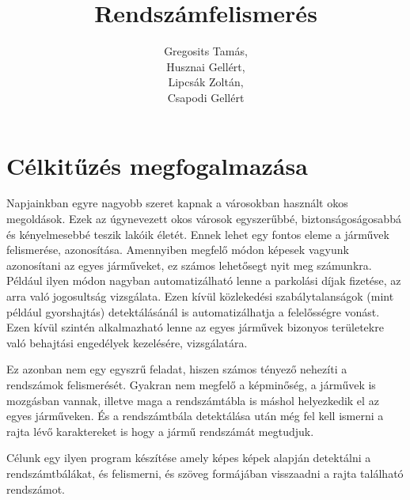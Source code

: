 \documentclass[12pt,a4paper]{article}
\author{Gregosits Tamás,\\Husznai Gellért,\\Lipcsák Zoltán,\\Csapodi Gellért}
\title{Rendszámfelismerés}
\begin{document}
\maketitle
\newpage
\tableofcontents
\newpage
    \section{Célkitűzés megfogalmazása}
    Napjainkban egyre nagyobb szeret kapnak a városokban használt okos megoldások.
    Ezek az úgynevezett okos városok egyszerűbbé, biztonságoságosabbá és kényelmesebbé teszik lakóik életét.
    Ennek lehet egy fontos eleme a járművek felismerése, azonosítása. 
    Amennyiben megfelő módon képesek vagyunk azonosítani az egyes járműveket, ez számos lehetősegt nyit meg számunkra.
    Például ilyen módon nagyban automatizálható lenne a parkolási díjak fizetése, 
    az arra való jogosultság vizsgálata. Ezen kívül közlekedési szabálytalanságok (mint például gyorshajtás)
    detektálásánál is automatizálhatja a felelősségre vonást. Ezen kívül szintén alkalmazható
    lenne az egyes járművek bizonyos területekre való behajtási engedélyek kezelésére, vizsgálatára.

    Ez azonban nem egy egyszrű feladat, hiszen számos tényező nehezíti a rendszámok felismerését.
    Gyakran nem megfelő a képminőség, a járművek is mozgásban vannak, illetve maga a rendszámtábla is 
    máshol helyezkedik el az egyes járműveken. És a rendszámtbála detektálása után még fel kell 
    ismerni a rajta lévő karaktereket is hogy a jármű rendszámát megtudjuk.

    Célunk egy ilyen program készítése amely képes képek alapján detektálni a rendszámtbálákat,
    és felismerni, és szöveg formájában visszaadni a rajta található rendszámot.
\end{document}
